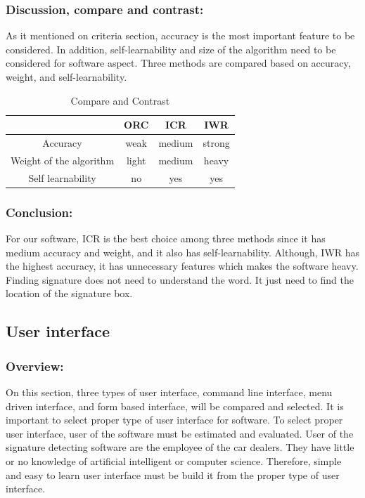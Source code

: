 \documentclass[article, onecolumn, draftclsnofoot,10pt, compsoc]{IEEEtran}
\begin{document}
\subsubsection{Discussion, compare and contrast:}
As it mentioned on criteria section, accuracy is the most important feature to be considered. In addition, self-learnability and size of the algorithm need to be considered for software aspect. Three methods are compared based on accuracy, weight, and self-learnability.

\begin{table}[h]
\centering
\begin{tabular}{ | c | c | c | c |}
\hline
 & ORC & ICR & IWR\\ 
\hline
Accuracy & weak & medium & strong \\ 
\hline
Weight of the algorithm & light & medium & heavy\\ 
\hline
Self learnability & no & yes & yes\\ 
\hline
\end{tabular}
\caption{Compare and Contrast}
\label{table:1}
\end{table}

\subsubsection{Conclusion:}
For our software, ICR is the best choice among three methods since it has medium accuracy and weight, and it also has self-learnability. Although, IWR has the highest accuracy, it has unnecessary features which makes the software heavy. Finding signature does not need to understand the word. It just need to find the location of the signature box. 

\subsection{User interface}
\subsubsection{Overview:}
On this section, three types of user interface, command line interface, menu driven interface, and form based interface, will be compared and selected. It is important to select proper type of user interface for software. To select proper user interface, user of the software must be estimated and evaluated. User of the signature detecting software are the employee of the car dealers. They have little or no knowledge of artificial intelligent or computer science. Therefore, simple and easy to learn user interface must be build it from the proper type of user interface.
\end{document}

